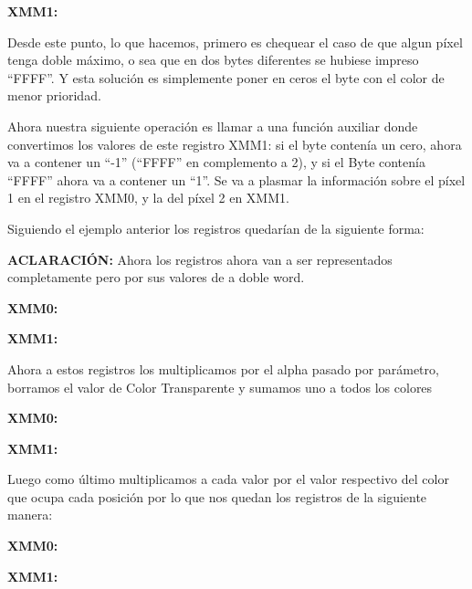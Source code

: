 \par{\textbf{XMM1:}}

\qquad 	\par{Desde este punto, lo que hacemos, primero es chequear el caso de que algun píxel tenga doble máximo, o sea que en dos bytes diferentes se hubiese impreso ``FFFF''. Y esta solución es simplemente poner en ceros el byte con el color de menor prioridad.}
\par{Ahora  nuestra siguiente operación es llamar a una función auxiliar donde convertimos los valores de este registro XMM1: si el byte contenía un cero, ahora va a contener un ``-1'' (``FFFF'' en complemento a 2), y si el Byte contenía ``FFFF'' ahora va a contener un ``1''. Se va a plasmar la información sobre el píxel 1 en el registro XMM0, y la del píxel 2 en XMM1.}
\par{Siguiendo el ejemplo anterior los registros quedarían de la siguiente forma:}
\par{\textbf{ACLARACIÓN:} Ahora los registros ahora van a ser representados completamente pero por sus valores de a doble word.}\\

\par{\textbf{XMM0:}}

\par{\textbf{XMM1:}}

\par{Ahora a estos registros los multiplicamos por el alpha pasado por parámetro, borramos el valor de Color Transparente y sumamos uno a todos los colores}\\

\par{\textbf{XMM0:}}

\par{\textbf{XMM1:}}


\par{Luego como último multiplicamos a cada valor por el valor respectivo del color que ocupa cada posición por lo que nos quedan los registros de la siguiente manera:}

\par{\textbf{XMM0:}}

\par{\textbf{XMM1:}}
	
